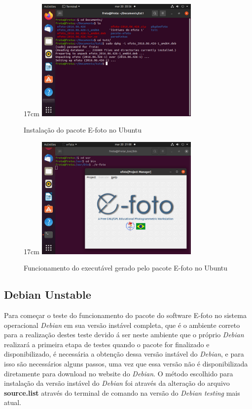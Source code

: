 \begin{figure}[!ht]{17cm}
	\centering
	\includegraphics[width=8cm]{Figuras/ubuntu_insta.jpg}
	\caption{Instalação do pacote E-foto no Ubuntu} \label{fig:ubuntu_insta}
\end{figure}

\begin{figure}[!ht]{17cm}
	\centering
	\includegraphics[width=8cm]{Figuras/ubuntu_exec.jpg}
	\caption{Funcionamento do executável gerado pelo pacote E-foto no Ubuntu} \label{fig:ubuntu_exec}
\end{figure}


\subsection{Debian Unstable}

Para começar o teste do funcionamento do pacote do software E-foto no sistema operacional \textit{Debian} em sua versão instável completa, que é o ambiente correto para a realização destes teste devido á ser neste ambiente que o próprio \textit{Debian} realizará a primeira etapa de testes quando o pacote for finalizado e disponibilizado, é necessária a obtenção dessa versão instável do \textit{Debian}, e para isso são necessários alguns passos, uma vez que essa versão não é disponibilizada diretamente para download no website do \textit{Debian}. O método escolhido para instalação da versão instável do \textit{Debian} foi através da alteração do arquivo \textbf{source.list} através do terminal de comando na versão do \textit{Debian testing} mais atual. 


